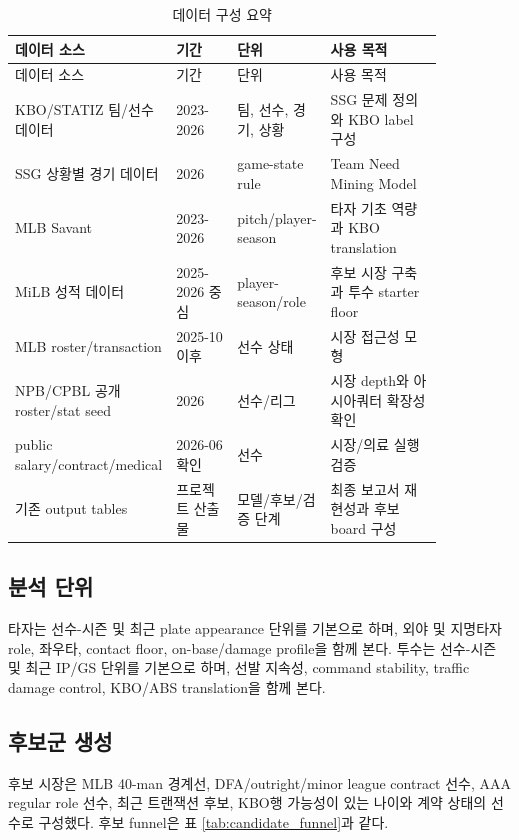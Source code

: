 \documentclass[11pt,a4paper]{article}
\begin{document}
\begin{longtable}{L{0.23\linewidth}L{0.15\linewidth}L{0.18\linewidth}L{0.29\linewidth}}
\caption{데이터 구성 요약}
\label{tab:data_sources}\\
\toprule
데이터 소스 & 기간 & 단위 & 사용 목적 \\
\midrule
\endfirsthead
\toprule
데이터 소스 & 기간 & 단위 & 사용 목적 \\
\midrule
\endhead
KBO/STATIZ 팀/선수 데이터 & 2023-2026 & 팀, 선수, 경기, 상황 & SSG 문제 정의와 KBO label 구성 \\
SSG 상황별 경기 데이터 & 2026 & game-state rule & Team Need Mining Model \\
MLB Savant & 2023-2026 & pitch/player-season & 타자 기초 역량과 KBO translation \\
MiLB 성적 데이터 & 2025-2026 중심 & player-season/role & 후보 시장 구축과 투수 starter floor \\
MLB roster/transaction & 2025-10 이후 & 선수 상태 & 시장 접근성 모형 \\
NPB/CPBL 공개 roster/stat seed & 2026 & 선수/리그 & 시장 depth와 아시아쿼터 확장성 확인 \\
public salary/contract/medical & 2026-06 확인 & 선수 & 시장/의료 실행 검증 \\
기존 output tables & 프로젝트 산출물 & 모델/후보/검증 단계 & 최종 보고서 재현성과 후보 board 구성 \\
\bottomrule
\end{longtable}

\subsection{분석 단위}
타자는 선수-시즌 및 최근 plate appearance 단위를 기본으로 하며, 외야 및 지명타자 role, 좌우타, contact floor, on-base/damage profile을 함께 본다. 투수는 선수-시즌 및 최근 IP/GS 단위를 기본으로 하며, 선발 지속성, command stability, traffic damage control, KBO/ABS translation을 함께 본다.

\subsection{후보군 생성}
후보 시장은 MLB 40-man 경계선, DFA/outright/minor league contract 선수, AAA regular role 선수, 최근 트랜잭션 후보, KBO행 가능성이 있는 나이와 계약 상태의 선수로 구성했다. 후보 funnel은 표 \ref{tab:candidate_funnel}과 같다.
\end{document}
